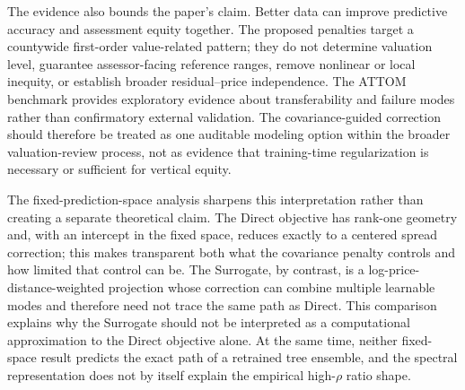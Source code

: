 \documentclass[10pt]{article}
\theoremstyle{definition}
\newcommand{\1}{\mathbf{1}}
\newcommand{\oldtext}[1]{\textcolor{blue}{\sout{#1}}}
\newcommand{\newtext}[1]{\textcolor{impGreen}{#1}}
\begin{document}
\newtext{The evidence also bounds the paper's claim. Better data can improve predictive accuracy and assessment equity together. The proposed penalties target a countywide first-order value-related pattern; they do not determine valuation level, guarantee assessor-facing reference ranges, remove nonlinear or local inequity, or establish broader residual--price independence. The ATTOM benchmark provides exploratory evidence about transferability and failure modes rather than confirmatory external validation. The covariance-guided correction should therefore be treated as one auditable modeling option within the broader valuation-review process, not as evidence that training-time regularization is necessary or sufficient for vertical equity.}

\newtext{The fixed-prediction-space analysis sharpens this interpretation rather than creating a separate theoretical claim. The Direct objective has rank-one geometry and, with an intercept in the fixed space, reduces exactly to a centered spread correction; this makes transparent both what the covariance penalty controls and how limited that control can be. The Surrogate, by contrast, is a log-price-distance-weighted projection whose correction can combine multiple learnable modes and therefore need not trace the same path as Direct. This comparison explains why the Surrogate should not be interpreted as a computational approximation to the Direct objective alone. At the same time, neither fixed-space result predicts the exact path of a retrained tree ensemble, and the spectral representation does not by itself explain the empirical high-$\rho$ ratio shape.}
\end{document}
